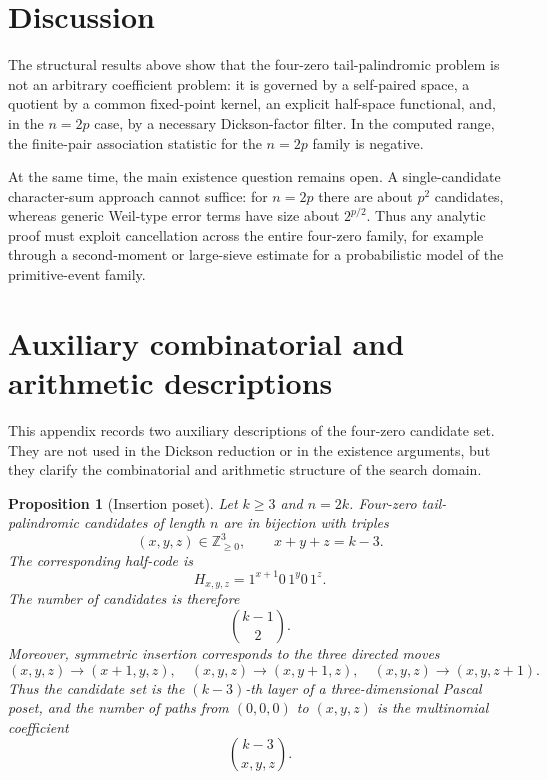 \documentclass[11pt]{article}
\newtheorem{proposition}[theorem]{Proposition}
\theoremstyle{definition}
\theoremstyle{remark}
\begin{document}
\section{Discussion}
\label{sec:discussion}

The structural results above show that the four-zero tail-palindromic problem is not an arbitrary coefficient problem: it is governed by a self-paired space, a quotient by a common fixed-point kernel, an explicit half-space functional, and, in the $n=2p$ case, by a necessary Dickson-factor filter. In the computed range, the finite-pair association statistic for the $n=2p$ family is negative.

At the same time, the main existence question remains open. A single-candidate character-sum approach cannot suffice: for \(n=2p\) there are about \(p^2\) candidates, whereas generic Weil-type error terms have size about \(2^{p/2}\). Thus any analytic proof must exploit cancellation across the entire four-zero family, for example through a second-moment or large-sieve estimate for a probabilistic model of the primitive-event family.


\appendix

\section{Auxiliary combinatorial and arithmetic descriptions}
\label{app:arith}

This appendix records two auxiliary descriptions of the four-zero candidate set. They are not used in the Dickson reduction or in the existence arguments, but they clarify the combinatorial and arithmetic structure of the search domain.

\begin{proposition}[Insertion poset]\label{prop:insertion-poset}
Let \(k\ge3\) and \(n=2k\). Four-zero tail-palindromic candidates of length \(n\) are in bijection with triples
\[
(x,y,z)\in\mathbb Z_{\ge0}^3,\qquad x+y+z=k-3.
\]
The corresponding half-code is
\[
H_{x,y,z}=1^{x+1}0\,1^y0\,1^z.
\]
The number of candidates is therefore
\[
\binom{k-1}{2}.
\]
Moreover, symmetric insertion corresponds to the three directed moves
\[
(x,y,z)\to(x+1,y,z),\quad
(x,y,z)\to(x,y+1,z),\quad
(x,y,z)\to(x,y,z+1).
\]
Thus the candidate set is the \((k-3)\)-th layer of a three-dimensional Pascal poset, and the number of paths from \((0,0,0)\) to \((x,y,z)\) is the multinomial coefficient
\[
\binom{k-3}{x,y,z}.
\]
\end{proposition}
\end{document}
